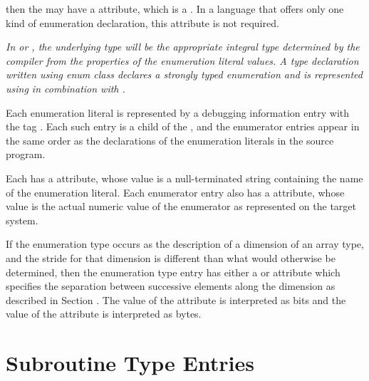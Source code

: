 then the  may 
have a \DWATenumclassDEFN{}
attribute, which is a . 
In a language that offers only
one kind of enumeration declaration, this attribute is not
required.

\textit{In  or , 
the underlying type will be the appropriate
integral type determined by the compiler from the properties 
of\hypertarget{chap:DWATenumclasstypesafeenumerationdefinition}{}
the enumeration literal values. 
A  type declaration written
using enum class declares a strongly typed enumeration and
is represented using \DWTAGenumerationtype{} 
in combination with \DWATenumclass.}

Each enumeration literal is represented by a debugging
information entry with the 
tag \DWTAGenumeratorTARG. 
Each
such entry is a child of the 
, and the
enumerator entries appear in the same order as the declarations
of the enumeration literals in the source program.

Each  has a \DWATname{} attribute, whose
value is a null-terminated string containing the name of 
the\hypertarget{chap:DWATconstvalueenumerationliteralvalue}{}
enumeration literal.
\bbeb
Each enumerator entry also has a 
\DWATconstvalueDEFN{} attribute,
whose value is the actual numeric value of the enumerator as
represented on the target system.

If the enumeration type occurs as the description of a
dimension of an array type, and the stride for that 
dimension\hypertarget{chap:DWATbytestrideenumerationstridedimensionofarraytype}{}
is different than what would otherwise be determined, 
then\hypertarget{chap:DWATbitstrideenumerationstridedimensionofarraytype}{}
the enumeration type entry has either a
\DWATbytestrideDEFN{} or
\DWATbitstrideDEFN{} attribute which specifies the separation
between successive elements along the dimension as described
in Section . 
The value of the \DWATbitstride{} attribute
is interpreted as bits and 
the value of the \DWATbytestride{} attribute is interpreted 
as bytes.


\section{Subroutine Type Entries}
\label{chap:subroutinetypeentries}

